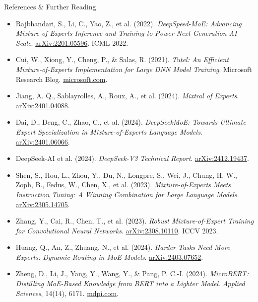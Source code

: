\begin{frame}[allowframebreaks]{References \& Further Reading}
\begin{itemize}
\item Rajbhandari, S., Li, C., Yao, Z., et al. (2022). \emph{DeepSpeed-MoE: Advancing Mixture-of-Experts Inference and Training to Power Next-Generation AI Scale}. \href{https://arxiv.org/abs/2201.05596}{arXiv:2201.05596}. ICML 2022.

\item Cui, W., Xiong, Y., Cheng, P., \& Salas, R. (2021). \emph{Tutel: An Efficient Mixture-of-Experts Implementation for Large DNN Model Training}. Microsoft Research Blog. \href{https://www.microsoft.com/en-us/research/blog/tutel-an-efficient-mixture-of-experts-implementation-for-large-dnn-model-training/}{microsoft.com}.

\item Jiang, A. Q., Sablayrolles, A., Roux, A., et al. (2024). \emph{Mixtral of Experts}. \href{https://arxiv.org/abs/2401.04088}{arXiv:2401.04088}.

\item Dai, D., Deng, C., Zhao, C., et al. (2024). \emph{DeepSeekMoE: Towards Ultimate Expert Specialization in Mixture-of-Experts Language Models}. \href{https://arxiv.org/abs/2401.06066}{arXiv:2401.06066}.

\item DeepSeek-AI et al. (2024). \emph{DeepSeek-V3 Technical Report}. \href{https://arxiv.org/abs/2412.19437}{arXiv:2412.19437}.

\item Shen, S., Hou, L., Zhou, Y., Du, N., Longpre, S., Wei, J., Chung, H. W., Zoph, B., Fedus, W., Chen, X., et al. (2023). \emph{Mixture-of-Experts Meets Instruction Tuning: A Winning Combination for Large Language Models}. \href{https://arxiv.org/abs/2305.14705}{arXiv:2305.14705}.

\item Zhang, Y., Cai, R., Chen, T., et al. (2023). \emph{Robust Mixture-of-Expert Training for Convolutional Neural Networks}. \href{https://arxiv.org/abs/2308.10110}{arXiv:2308.10110}. ICCV 2023.

\item Huang, Q., An, Z., Zhuang, N., et al. (2024). \emph{Harder Tasks Need More Experts: Dynamic Routing in MoE Models}. \href{https://arxiv.org/abs/2403.07652}{arXiv:2403.07652}.

\item Zheng, D., Li, J., Yang, Y., Wang, Y., \& Pang, P. C.-I. (2024). \emph{MicroBERT: Distilling MoE-Based Knowledge from BERT into a Lighter Model}. \emph{Applied Sciences}, 14(14), 6171. \href{https://www.mdpi.com/2076-3417/14/14/6171}{mdpi.com}.


\end{itemize}
\end{frame}
